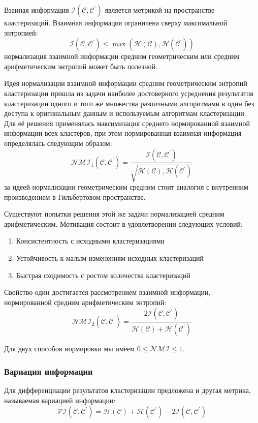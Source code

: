 Взаиная информация $\mathcal{I}(\mathcal{C}, \mathcal{C}^\prime)$ является метрикой на пространстве кластеризаций.  Взаимная информация ограничена сверху максимальной энтропией:
\begin{equation}
	\mathcal{I}(\mathcal{C}, \mathcal{C}^\prime) \leq \max(\mathcal{H}(\mathcal{C}),\mathcal{H}(\mathcal{C}^\prime))
\end{equation}
нормализация взаимной информации средним геометрическим или средним арифметическим энтропий может быть полезной. 

Идея нормализации взаимной информации средним геометрическим энтропий кластеризации пришла из задачи наиболее достоверного усреднения результатов кластеризации одного и того же множества разоичными алгоритмами в один без доступа к оригинальным данным и используемым алгоритмам кластеризации. Для её решения применялась максимизация среднего нормированной взаимной информации всех кластеров, при этом нормированная взаимная информация определялась следующим образом:
\begin{equation}
	\mathcal{NMI}_1(\mathcal{C,C}^\prime) = \frac{\mathcal{I(C,C^\prime)}}{\sqrt{\mathcal{H(C),H(C^\prime)}}}
\end{equation}
за идеей нормализации геометрическим средним стоит аналогия с внутренним произведением в Гильбертовом пространстве. 

Существуют попытки решения этой же задачи нормализацией средним арифметическим. Мотивация состоит в удовлетворении следующих условий:
\begin{enumerate}
	\item Консистентность с исходными кластеризациями
	\item Устойчивость к малым изменениям исходных кластеризаций
	\item Быстрая сходимость с ростом количества кластеризаций
\end{enumerate}
Свойство один достигается рассмотрением взаимной информации, нормированной средним арифметическим энтропий:
\begin{equation}
	\mathcal{NMI}_2(\mathcal{C,C}^\prime) = \frac{2\mathcal{I(C,C^\prime)}}{\mathcal{H(C)+H(C^\prime)}}
\end{equation}

Для двух способов нормировки мы имеем $0 \leq \mathcal{NMI} \leq 1$.

\subsubsection{Вариация информации}
Для дифференциации результатов кластеризации предложена и другая метрика, называемая вариацией информации\cite{vinh2010information}:
\begin{equation}
	\mathcal{VI(C,C^\prime)} = \mathcal{H(C) + H(C^\prime)} - 2\mathcal{ I(C,C^\prime)}
\end{equation}

